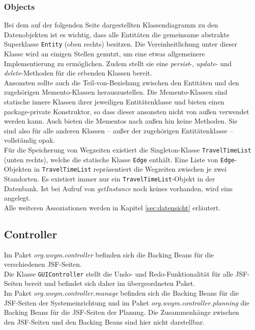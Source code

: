 \documentclass[fontsize=12pt,paper=a4,twoside]{scrartcl}
\begin{document}
\subsubsection{Objects}
\label{subsubsec:Objects}
Bei dem auf der folgenden Seite dargestellten Klassendiagramm zu den Datenobjekten ist es wichtig, dass alle Entitäten die gemeinsame abstrakte Superklasse \texttt{Entity} (oben rechts) besitzen. Die Vereinheitlichung unter dieser Klasse wird an einigen Stellen genutzt, um eine etwas allgemeinere Implementierung zu ermöglichen. Zudem stellt sie eine \textit{persist}-, \textit{update}- und \textit{delete}-Methoden für die erbenden Klassen bereit.\\
Ansonsten sollte auch die Teil-von-Beziehung zwischen den Entitäten und den zugehörigen Memento-Klassen herauszustellen. Die Memento-Klassen sind statische innere Klassen ihrer jeweiligen Entitätenklasse und bieten einen package-private Konstruktor, so dass dieser ansonsten nicht von außen verwendet werden kann. Auch bieten die Mementos nach außen hin keine Methoden. Sie sind also für alle anderen Klassen -- außer der zugehörigen Entitätenklasse -- vollständig opak.\\
Für die Speicherung von Wegzeiten existiert die Singleton-Klasse \texttt{TravelTimeList} (unten rechts), welche die statische Klasse \texttt{Edge} enthält. Eine Liste von \texttt{Edge}-Objekten in \texttt{TravelTimeList} repräsentiert die Wegzeiten zwischen je zwei Standorten. Es existiert immer nur ein \texttt{TravelTimeList}-Objekt in der Datenbank. Ist bei Aufruf von \textit{getInstance} noch keines vorhanden, wird eins angelegt.\\
Alle weiteren Assoziationen werden in Kapitel \ref{sec:datensicht} erläutert.




\subsection{Controller}
\label{subsec:Controller}

Im Paket \textit{org.woym.controller} befinden sich die Backing Beans für die verschiedenen JSF-Seiten. \\
Die Klasse \texttt{GUIController} stellt die Undo- und Redo-Funktionalität für alle JSF-Seiten bereit und befindet sich daher im übergeordneten Paket.\\
Im Paket \textit{org.woym.controller.manage} befinden sich die Backing Beans für die JSF-Seiten der Systemeinrichtung und im Paket \textit{org.woym.controller.planning} die Backing Beans für die JSF-Seiten der Planung. Die Zusammenhänge zwischen den JSF-Seiten und den Backing Beans sind hier nicht darstellbar. 
\end{document}
